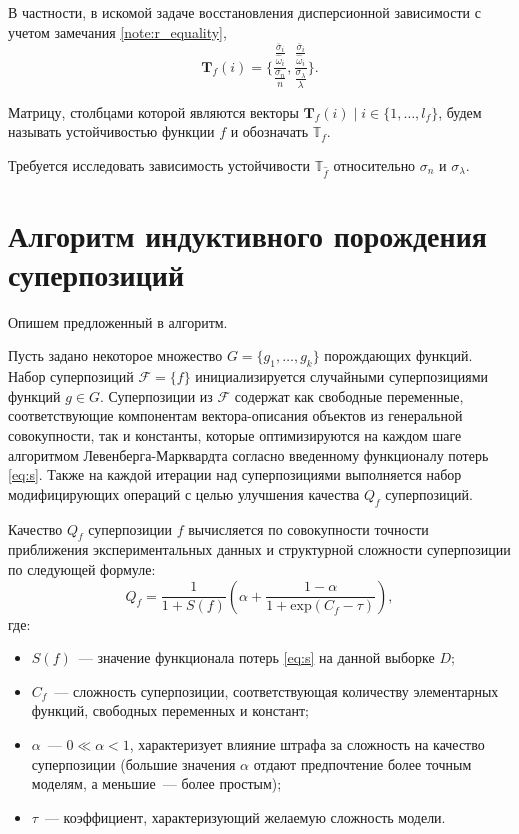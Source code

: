 \documentclass[12pt,a4paper]{article}
\theoremstyle{definition}
\begin{document}
В частности, в искомой задаче восстановления дисперсионной зависимости с
учетом замечания \ref{note:r_equality},
\[
  \mathbf{T}_f(i) = \big\{ \frac{\frac{\overline{\sigma}_i}{\hat{\omega}_i}}{\frac{\sigma_n}{n}}, \frac{\frac{\overline{\sigma}_i}{\hat{\omega}_i}}{\frac{\sigma_{\lambda}}{\lambda}} \big\}.
\]

Матрицу, столбцами которой являются векторы $\mathbf{T}_f(i) \mid i \in \{ 1, \dots, l_f \}$,
будем называть устойчивостью функции $f$ и обозначать $\mathbb{T}_f$.

Требуется исследовать зависимость устойчивости $\mathbb{T}_{\hat{f}}$ относительно
$\sigma_n$ и $\sigma_{\lambda}$.

\section{Алгоритм индуктивного порождения суперпозиций}

Опишем предложенный в \cite{Rudoy13} алгоритм.

Пусть задано некоторое множество $G = \{ g_1, \dots, g_k \}$ 
порождающих функций. Набор суперпозиций $\mathcal{F} = \{ f \}$
инициализируется случайными суперпозициями функций $g \in G$. Суперпозиции из
$\mathcal{F}$ содержат как свободные переменные, соответствующие
компонентам вектора-описания объектов из генеральной совокупности, так и
константы, которые оптимизируются на каждом шаге алгоритмом Левенберга-Марквардта
согласно введенному функционалу потерь \eqref{eq:s}. Также на каждой итерации
над суперпозициями выполняется набор модифицирующих операций с целью улучшения
качества $Q_f$ суперпозиций.

Качество $Q_f$ суперпозиции $f$ вычисляется по совокупности точности приближения
экспериментальных данных и структурной сложности суперпозиции по следующей формуле:
\begin{equation}
  Q_f = \frac{1}{1 + S(f)} \left(\alpha + \frac{1 - \alpha}{1 + \text{exp} (C_f - \tau)}\right),
  \label{eq:s_f}
\end{equation}
где:
\begin{itemize}
  \item[] $S(f)$~--- значение функционала потерь \eqref{eq:s} на данной выборке $D$;
  \item[] $C_f$~--- сложность суперпозиции, соответствующая количеству элементарных
	функций, свободных переменных и констант;
  \item[] $\alpha$~--- $0 \ll \alpha < 1$, характеризует влияние штрафа за сложность
	на качество суперпозиции (большие значения $\alpha$ отдают предпочтение более
	точным моделям, а меньшие~--- более простым);
  \item[] $\tau$~--- коэффициент, характеризующий желаемую сложность модели.
\end{itemize}
\end{document}
